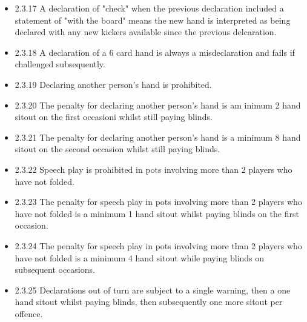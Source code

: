 \documentclass[a4paper,12pt]{article}
\begin{document}
\begin{itemize}
\item 2.3.17 A declaration of "check" when the previous declaration included a statement of "with the board" means the new hand is interpreted as being declared with any new kickers available since the previous delcaration.
\item 2.3.18 A declaration of a 6 card hand is always a misdeclaration and fails if challenged subsequently.
\item 2.3.19 Declaring another person's hand is prohibited.
\item 2.3.20 The penalty for declaring another person's hand is am inimum 2 hand sitout on the first occasioni whilst still paying blinds.
\item 2.3.21 The penalty for declaring another person’s hand is a minimum 8 hand sitout on the second occasion whilst still paying blinds.
\item 2.3.22 Speech play is prohibited in pots involving more than 2 players who have not folded.
\item 2.3.23 The penalty for speech play in pots involving more than 2 players who have not folded is a minimum 1 hand sitout whilst paying blinds on the first occasion.
\item 2.3.24 The penalty for speech play in pots involving more than 2 players who have not folded is a minimum 4 hand sitout while paying blinds on subsequent occasions.
\item 2.3.25 Declarations out of turn are subject to a single warning, then a one hand sitout whilst paying blinds, then subsequently one more sitout per offence. 

\end{itemize}
\end{document}
